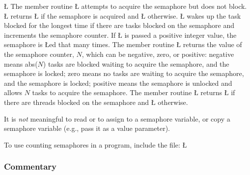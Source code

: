 \documentclass[openright,twoside]{report}
\begin{document}
\LGinlinefalse\LGbegin\lgrinde
\L{}
\endlgrinde\LGend
The member routine \LGinlinetrue\LGbegin\lgrinde\L{}\endlgrinde\LGend{} attempts to acquire the semaphore but does not block.
\LGinlinetrue\LGbegin\lgrinde\L{}\endlgrinde\LGend{} returns \LGinlinetrue\LGbegin\lgrinde\L{}\endlgrinde\LGend{} if the semaphore is acquired and \LGinlinetrue\LGbegin\lgrinde\L{}\endlgrinde\LGend{} otherwise.
\LGinlinetrue\LGbegin\lgrinde\L{}\endlgrinde\LGend{} wakes up the task blocked for the longest time if there are tasks blocked on the semaphore and increments the semaphore counter.
If \LGinlinetrue\LGbegin\lgrinde\L{}\endlgrinde\LGend{} is passed a positive integer value, the semaphore is \LGinlinetrue\LGbegin\lgrinde\L{}\endlgrinde\LGend{}ed that many times.
The member routine \LGinlinetrue\LGbegin\lgrinde\L{}\endlgrinde\LGend{} returns the value of the semaphore counter, $N$, which can be negative, zero, or positive:
negative means abs($N$) tasks are blocked waiting to acquire the semaphore, and the semaphore is locked;
zero means no tasks are waiting to acquire the semaphore, and the semaphore is locked;
positive means the semaphore is unlocked and allows $N$ tasks to acquire the semaphore.
The member routine \LGinlinetrue\LGbegin\lgrinde\L{}\endlgrinde\LGend{} returns \LGinlinetrue\LGbegin\lgrinde\L{}\endlgrinde\LGend{} if there are threads blocked on the semaphore and \LGinlinetrue\LGbegin\lgrinde\L{}\endlgrinde\LGend{} otherwise.

It is \emph{not} meaningful to read or to assign to a semaphore variable, or copy a semaphore variable (e.g., pass it as a value parameter).

To use counting semaphores in a \uC program, include the file:
\LGinlinefalse\LGbegin\lgrinde
\L{}
\endlgrinde\LGend
{}%


\subsubsection{Commentary}
\end{document}

